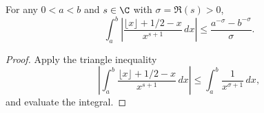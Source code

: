 \begin{lemma}
\label{ZetaBnd_aux1a}
\leanok
For any $0 < a < b$ and  $s \in \C$ with $\sigma=\Re(s)>0$,
  $$
  \int_a^b \left|\frac{\lfloor x\rfloor + 1/2 - x}{x^{s+1}} \, dx\right|
  \le \frac{a^{-\sigma}-b^{-\sigma}}{\sigma}.
  $$
\end{lemma}
\begin{proof}
\leanok
Apply the triangle inequality
  $$
  \left|\int_a^b \frac{\lfloor x\rfloor + 1/2 - x}{x^{s+1}} \, dx\right|
  \le \int_a^b \frac{1}{x^{\sigma+1}} \, dx,
  $$
  and evaluate the integral.
\end{proof}
